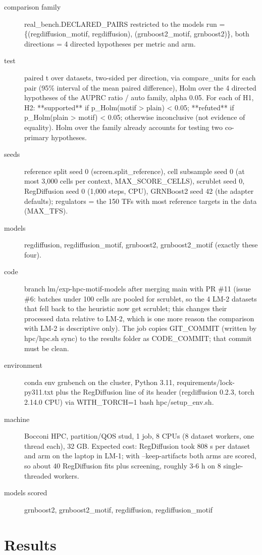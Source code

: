 \documentclass{article}
\begin{document}
\begin{description}
\item[comparison family] real\_bench.DECLARED\_PAIRS restricted to the models run = \{(regdiffusion\_motif, regdiffusion), (grnboost2\_motif, grnboost2)\}, both directions = 4 directed hypotheses per metric and arm.
\item[test] paired t over datasets, two-sided per direction, via compare\_units for each pair (95\% interval of the mean paired difference), Holm over the 4 directed hypotheses of the AUPRC ratio / auto family, alpha 0.05. For each of H1, H2: **supported** if p\_Holm(motif > plain) < 0.05; **refuted** if p\_Holm(plain > motif) < 0.05; otherwise inconclusive (not evidence of equality). Holm over the family already accounts for testing two co-primary hypotheses.
\item[seeds] reference split seed 0 (screen.split\_reference), cell subsample seed 0 (at most 3,000 cells per context, MAX\_SCORE\_CELLS), scrublet seed 0, RegDiffusion seed 0 (1,000 steps, CPU), GRNBoost2 seed 42 (the adapter defaults); regulators = the 150 TFs with most reference targets in the data (MAX\_TFS).
\item[models] regdiffusion, regdiffusion\_motif, grnboost2, grnboost2\_motif (exactly these four).
\item[code] branch lm/exp-hpc-motif-models after merging main with PR \#11 (issue \#6: batches under 100 cells are pooled for scrublet, so the 4 LM-2 datasets that fell back to the heuristic now get scrublet; this changes their processed data relative to LM-2, which is one more reason the comparison with LM-2 is descriptive only). The job copies GIT\_COMMIT (written by hpc/hpc.sh sync) to the results folder as CODE\_COMMIT; that commit must be clean.
\item[environment] conda env grnbench on the cluster, Python 3.11, requirements/lock-py311.txt plus the RegDiffusion line of its header (regdiffusion 0.2.3, torch 2.14.0 CPU) via WITH\_TORCH=1 bash hpc/setup\_env.sh.
\item[machine] Bocconi HPC, partition/QOS stud, 1 job, 8 CPUs (8 dataset workers, one thread each), 32 GB. Expected cost: RegDiffusion took 808 s per dataset and arm on the laptop in LM-1; with --keep-artifacts both arms are scored, so about 40 RegDiffusion fits plus screening, roughly 3-6 h on 8 single-threaded workers.
\item[models scored] grnboost2, grnboost2\_motif, regdiffusion, regdiffusion\_motif
\end{description}

\section{Results}
\end{document}
